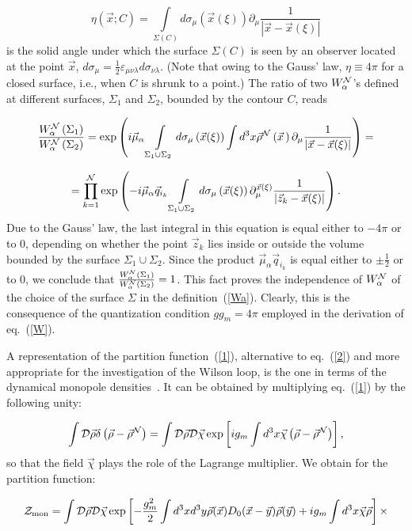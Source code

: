 \documentclass[a4paper,12pt]{article}
\begin{document}
$$
\eta\left(\vec x; C\right)=\int\limits_{\Sigma(C)}^{}
d\sigma_\mu\left(\vec x(\xi)\right)\partial_\mu\frac{1}{\left|\vec x-\vec x(\xi)\right|}$$
is the solid angle under which the surface $\Sigma(C)$ is seen by an observer located at the point $\vec x$, $d\sigma_\mu=
\frac12\varepsilon_{\mu\nu\lambda}d\sigma_{\nu\lambda}$. (Note that owing to
the Gauss' law, $\eta\equiv4\pi$ for a closed surface, i.e., when $C$ is shrunk to a point.) The ratio of two $W_\alpha^{\cal N}$'s
defined at different surfaces, $\Sigma_1$ and $\Sigma_2$, bounded by the contour $C$, reads

$$
\frac{W_\alpha^{\cal N}\left(\Sigma_1\right)}{W_\alpha^{\cal N}\left(\Sigma_2\right)}=\exp\left(i\vec\mu_\alpha
\int\limits_{\Sigma_1\cup\Sigma_2}^{}d\sigma_\mu\left(\vec x(\xi)\right)\int d^3x\vec\rho^{\cal N}
\left(\vec x{\,}\right)\partial_\mu\frac{1}{\left|\vec x-\vec x(\xi)\right|}\right)=$$

$$
=\prod\limits_{k=1}^{\cal N}\exp\left(-i\vec\mu_\alpha\vec q_{i_k}
\int\limits_{\Sigma_1\cup\Sigma_2}^{}d\sigma_\mu\left(\vec x(\xi)\right)\partial_\mu^{\vec x(\xi)}
\frac{1}{\left|\vec z_k-\vec x(\xi)\right|}\right).$$
Due to the Gauss' law, the last integral in this equation is equal either to $-4\pi$ or to $0$, depending on whether
the point $\vec z_k$ lies inside or outside the volume bounded by the surface $\Sigma_1\cup\Sigma_2$. Since the product
$\vec\mu_\alpha\vec q_{i_k}$ is equal either to $\pm\frac12$ or to $0$, we conclude that
$\frac{W_\alpha^{\cal N}\left(\Sigma_1\right)}{W_\alpha^{\cal N}\left(\Sigma_2\right)}=1$. This fact proves the
independence of $W_\alpha^{\cal N}$ of the choice of the surface $\Sigma$ in the definition~(\ref{Wa}).
Clearly, this is the consequence of the quantization condition $gg_m=4\pi$ employed in the derivation of eq.~(\ref{W}).

A representation of the partition function~(\ref{1}), alternative to eq.~(\ref{2}) and more appropriate for the
investigation of the Wilson loop, is the one in terms of the
dynamical monopole densities~\cite{mpla}.
It can be obtained by multiplying eq.~(\ref{1}) by the following unity:

$$
\int {\cal D}\vec\rho\delta\left(\vec\rho-\vec\rho^{\cal N}\right)=
\int {\cal D}\vec\rho{\cal D}\vec\chi\exp\left[ig_m\int d^3x\vec\chi\left(\vec\rho
-\vec\rho^{\cal N}\right)\right],$$
so that the field $\vec\chi$ plays the role of the Lagrange multiplier. We obtain for the partition function:

$$
{\cal Z}_{\rm mon}=\int{\cal D}\vec\rho{\cal D}\vec\chi\exp\left[-\frac{g_m^2}{2}\int d^3x d^3y\vec\rho(\vec x)D_0(\vec x-\vec y)
\vec\rho(\vec y)+ig_m\int d^3x\vec\chi\vec\rho\right]\times$$
\end{document}
